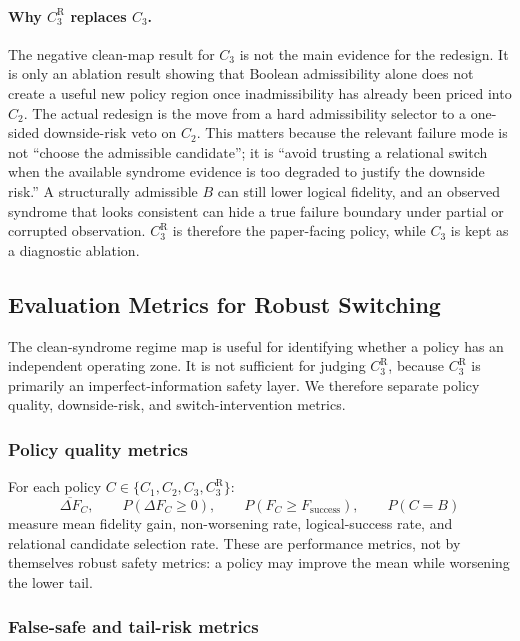 \documentclass[11pt,a4paper]{article}
\theoremstyle{definition}
\theoremstyle{remark}
\begin{document}
\paragraph{Why $C_3^{\mathrm{R}}$ replaces $C_3$.}
The negative clean-map result for $C_3$ is not the main evidence for the redesign.
It is only an ablation result showing that Boolean admissibility alone does not create
a useful new policy region once inadmissibility has already been priced into $C_2$.
The actual redesign is the move from a hard admissibility selector to a one-sided
downside-risk veto on $C_2$.  This matters because the relevant failure mode is not
``choose the admissible candidate''; it is ``avoid trusting a relational switch when
the available syndrome evidence is too degraded to justify the downside risk.''  A
structurally admissible $B$ can still lower logical fidelity, and an observed syndrome
that looks consistent can hide a true failure boundary under partial or corrupted
observation.  $C_3^{\mathrm{R}}$ is therefore the paper-facing policy, while $C_3$ is
kept as a diagnostic ablation.

\subsection{Evaluation Metrics for Robust Switching}

The clean-syndrome regime map is useful for identifying whether a policy has an
independent operating zone.  It is not sufficient for judging $C_3^{\mathrm{R}}$,
because $C_3^{\mathrm{R}}$ is primarily an imperfect-information safety layer.  We
therefore separate policy quality, downside-risk, and switch-intervention metrics.

\subsubsection*{Policy quality metrics}

For each policy $C\in\{C_1,C_2,C_3,C_3^{\mathrm{R}}\}$:
\[
\overline{\Delta F}_C,
\qquad
P(\Delta F_C\ge 0),
\qquad
P(F_C\ge F_{\mathrm{success}}),
\qquad
P(C=B)
\]
measure mean fidelity gain, non-worsening rate, logical-success rate, and relational
candidate selection rate.  These are performance metrics, not by themselves robust
safety metrics: a policy may improve the mean while worsening the lower tail.

\subsubsection*{False-safe and tail-risk metrics}
\end{document}
